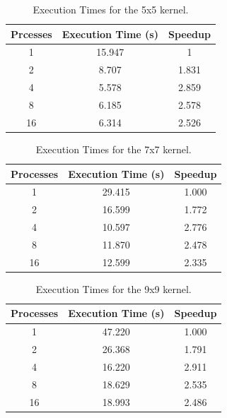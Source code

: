 \documentclass[10pt,twocolumn,letterpaper]{article}
\begin{document}
\begin{table}[H]
	\begin{center}
		\begin{tabular}{|c|c|c|}
			\hline
			Prcesses & Execution Time (s) & Speedup \\
			\hline
			1 & 15.947 & 1 \\
			2 & 8.707 & 1.831 \\
			4 & 5.578 & 2.859 \\
			8 & 6.185 & 2.578 \\
			16 & 6.314 & 2.526 \\
			\hline
		\end{tabular}
	\end{center}
	\caption{Execution Times for the 5x5 kernel.}
	\label{tab:speedup_k_2}
\end{table}

\begin{table}[H]
	\begin{center}
		\begin{tabular}{|c|c|c|}
			\hline
			Processes & Execution Time (s) & Speedup \\
			\hline
			1 & 29.415 & 1.000 \\
			2 & 16.599 & 1.772 \\
			4 & 10.597 & 2.776 \\
			8 & 11.870 & 2.478 \\
			16 & 12.599 & 2.335 \\
			\hline
		\end{tabular}
	\end{center}
	\caption{Execution Times for the 7x7 kernel.}
	\label{tab:speedup_k_3}
\end{table}

\begin{table}[H]
	\begin{center}
		\begin{tabular}{|c|c|c|}
			\hline
			Processes & Execution Time (s) & Speedup \\
			\hline
			1 & 47.220 & 1.000 \\
			2 & 26.368 & 1.791 \\
			4 & 16.220 & 2.911 \\
			8 & 18.629 & 2.535 \\
			16 & 18.993 & 2.486 \\
			\hline
		\end{tabular}
	\end{center}
	\caption{Execution Times for the 9x9 kernel.}
	\label{tab:speedup_k_4}
\end{table}
\end{document}
